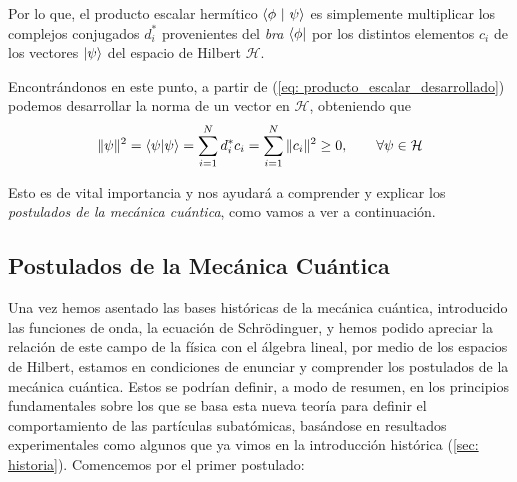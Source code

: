 \documentclass{article}
\numberwithin{equation}{section} %
\begin{document}
    \vspace{1.5mm}

    Por lo que, el producto escalar hermítico \( \braket{\phi \ | \ \psi} \) es simplemente multiplicar los complejos conjugados \( d_{i}^{*} \) provenientes del \textit{bra} \( \bra{\phi} \) por los distintos elementos \( c_{i} \) de los vectores \( \ket{\psi} \) del espacio de Hilbert \( \mathcal{H} \). 

    \vspace{5mm}

    Encontrándonos en este punto, a partir de (\ref{eq: producto_escalar_desarrollado}) podemos desarrollar la norma de un vector en \( \mathcal{H} \), obteniendo que
    \begin{equation}
        \| \psi \| ^{2} = \braket{\psi | \psi} = \sum_{i = 1}^{N} d_{i}^{*} c_{i} = \sum_{i = 1}^{N} \| c_{i} \| ^{2} \geq 0, \qquad \forall \psi \in \mathcal{H}
    \end{equation}

    \vspace{2mm}

    Esto es de vital importancia y nos ayudará a comprender y explicar los \textit{postulados de la mecánica cuántica}, como vamos a ver a continuación.


    \vspace{5mm}

    \subsection{Postulados de la Mecánica Cuántica}\label{sec: postulados}

    \vspace{5mm}

    Una vez hemos asentado las bases históricas de la mecánica cuántica, introducido las funciones de onda, la ecuación de Schrödinguer, y hemos podido apreciar la relación de este campo de la física con el álgebra lineal, por medio de los espacios de Hilbert, estamos en condiciones de enunciar y comprender los postulados de la mecánica cuántica. Estos se podrían definir, a modo de resumen, en los principios fundamentales sobre los que se basa esta nueva teoría para definir el comportamiento de las partículas subatómicas, basándose en resultados experimentales como algunos que ya vimos en la introducción histórica (\ref{sec: historia}). Comencemos por el primer postulado:
    
    \vspace{7.5mm}
\end{document}
